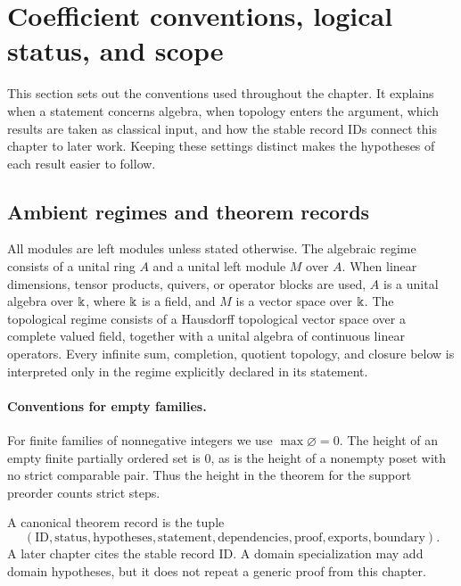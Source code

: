 \section{Coefficient conventions, logical status, and scope}
\begin{readerroadmap}
This section sets out the conventions used throughout the chapter.  It explains when a statement concerns algebra, when topology enters the argument, which results are taken as classical input, and how the stable record IDs connect this chapter to later work.  Keeping these settings distinct makes the hypotheses of each result easier to follow.
\end{readerroadmap}
\subsection{Ambient regimes and theorem records}

\begin{definition}
\label{def:coefficient-regime}
All modules are left modules unless stated otherwise.  The algebraic regime consists of a unital ring $A$ and a unital left module $M$ over $A$.  When linear dimensions, tensor products, quivers, or operator blocks are used, $A$ is a unital algebra over $\Bbbk$, where $\Bbbk$ is a field, and $M$ is a vector space over $\Bbbk$.  The topological regime consists of a Hausdorff topological vector space over a complete valued field, together with a unital algebra of continuous linear operators.  Every infinite sum, completion, quotient topology, and closure below is interpreted only in the regime explicitly declared in its statement.
\end{definition}
\paragraph{Conventions for empty families.} For finite families of nonnegative integers we use $\max\varnothing=0$. The height of an empty finite partially ordered set is $0$, as is the height of a nonempty poset with no strict comparable pair. Thus the height in the theorem for the support preorder counts strict steps.

\begin{definition}
\label{def:theorem-record}
A canonical theorem record is the tuple
\[
(\mathrm{ID},\mathrm{status},\mathrm{hypotheses},\mathrm{statement},
\mathrm{dependencies},\mathrm{proof},\mathrm{exports},\mathrm{boundary}).
\]
A later chapter cites the stable record ID.  A domain specialization may add domain hypotheses, but it does not repeat a generic proof from this chapter.
\end{definition}

